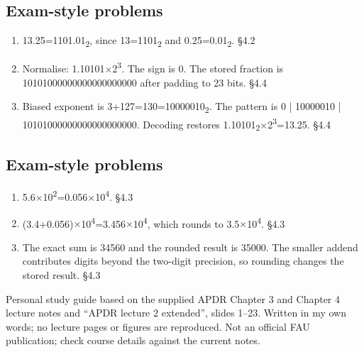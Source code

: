 \documentclass[11pt]{article}
\begin{document}
\begin{keepsection}\subsection{Exam-style problems}

\begin{enumerate}
\item 13.25=1101.01\textsubscript{2}, since 13=1101\textsubscript{2} and 0.25=0.01\textsubscript{2}. \hfill{\small\color{FAUblue}§4.2}
\item Normalise: 1.10101\ensuremath{\times}2\textsuperscript{3}. The sign is 0. The stored fraction is 10101000000000000000000 after padding to 23 bits. \hfill{\small\color{FAUblue}§4.4}
\item Biased exponent is 3+127=130=10000010\textsubscript{2}. The pattern is 0 | 10000010 | 10101000000000000000000. Decoding restores 1.10101\textsubscript{2}\ensuremath{\times}2\textsuperscript{3}=13.25. \hfill{\small\color{FAUblue}§4.4}
\end{enumerate}

\end{keepsection}
\begin{keepsection}\subsection{Exam-style problems}

\begin{enumerate}
\item 5.6\ensuremath{\times}10\textsuperscript{2}=0.056\ensuremath{\times}10\textsuperscript{4}. \hfill{\small\color{FAUblue}§4.3}
\item (3.4+0.056)\ensuremath{\times}10\textsuperscript{4}=3.456\ensuremath{\times}10\textsuperscript{4}, which rounds to 3.5\ensuremath{\times}10\textsuperscript{4}. \hfill{\small\color{FAUblue}§4.3}
\item The exact sum is 34560 and the rounded result is 35000. The smaller addend contributes digits beyond the two-digit precision, so rounding changes the stored result. \hfill{\small\color{FAUblue}§4.3}
\end{enumerate}

\end{keepsection}

\vfill{\small Personal study guide based on the supplied APDR Chapter 3 and Chapter 4 lecture notes and “APDR lecture 2 extended”, slides 1–23. Written in my own words; no lecture pages or figures are reproduced. Not an official FAU publication; check course details against the current notes.}
\end{document}
